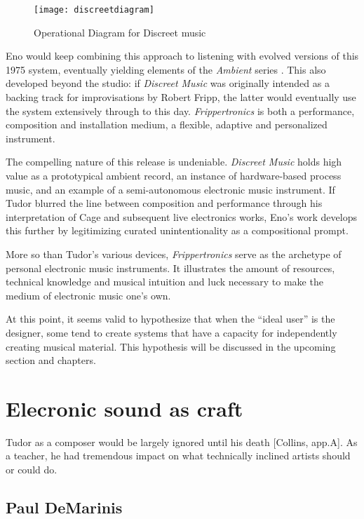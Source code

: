 \begin{itemize}
\begin{figure}[h!]
  \caption{Operational Diagram for Discreet music}
  \centering
    \texttt{[image: discreetdiagram]}
\end{figure}

Eno would keep combining this approach to listening with evolved versions of this 1975 system, eventually yielding elements of the \emph{Ambient} series \citep{eno1978,eno1980,eno1980b,eno1982}. This also developed beyond the studio: if \emph{Discreet Music} was originally intended as a backing track for improvisations by Robert Fripp, the latter would eventually use the system extensively through to this day. \emph{Frippertronics} is both a performance, composition and installation medium, a flexible, adaptive and personalized instrument.  

The compelling nature of this release is undeniable. \emph{Discreet Music } holds high value as a prototypical ambient record, an instance of hardware-based process music, and an example of a semi-autonomous electronic music instrument. If Tudor blurred the line between composition and performance through his interpretation of Cage and subsequent live electronics works, Eno's work develops this further by legitimizing curated unintentionality as a compositional prompt. 

More so than Tudor's various devices, \emph{Frippertronics} serve as the archetype of personal electronic music instruments. It illustrates the amount of resources, technical knowledge and musical intuition and luck necessary to make the medium of electronic music one's own. 

At this point, it seems valid to hypothesize that when the ``ideal user'' is the designer, some tend to create systems that have a capacity for independently creating musical material. This hypothesis will be discussed in the upcoming section and chapters.  

\section{Elecronic sound as craft} 

	Tudor as a composer would be largely ignored until his death [Collins, app.A]. As a teacher, he had tremendous impact on what technically inclined artists should or could do. 
	
\subsection{Paul DeMarinis}


\end{itemize}
